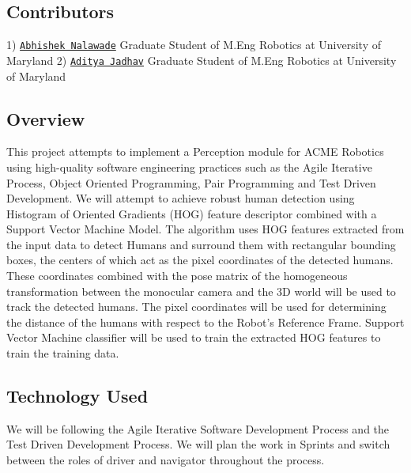 \href{https://app.travis-ci.com/iamjadhav/Human_Obstacle_Detector}{\tt } \href{https://coveralls.io/github/iamjadhav/Human_Obstacle_Detector?branch=development_sprint_1}{\tt } \subsection*{\href{https://opensource.org/licenses/MIT}{\tt } }

\subsection*{Contributors}

1) \href{https://github.com/iamjadhav}{\tt Abhishek Nalawade} Graduate Student of M.\+Eng Robotics at University of Maryland 2) \href{https://github.com/abhishek-nalawade}{\tt Aditya Jadhav} Graduate Student of M.\+Eng Robotics at University of Maryland

\subsection*{Overview}

This project attempts to implement a Perception module for A\+C\+ME Robotics using high-\/quality software engineering practices such as the Agile Iterative Process, Object Oriented Programming, Pair Programming and Test Driven Development. We will attempt to achieve robust human detection using Histogram of Oriented Gradients (H\+OG) feature descriptor combined with a Support Vector Machine Model. The algorithm uses H\+OG features extracted from the input data to detect Humans and surround them with rectangular bounding boxes, the centers of which act as the pixel coordinates of the detected humans. These coordinates combined with the pose matrix of the homogeneous transformation between the monocular camera and the 3D world will be used to track the detected humans. The pixel coordinates will be used for determining the distance of the humans with respect to the Robot’s Reference Frame. Support Vector Machine classifier will be used to train the extracted H\+OG features to train the training data.

\subsection*{Technology Used}

We will be following the Agile Iterative Software Development Process and the Test Driven Development Process. We will plan the work in Sprints and switch between the roles of driver and navigator throughout the process.


